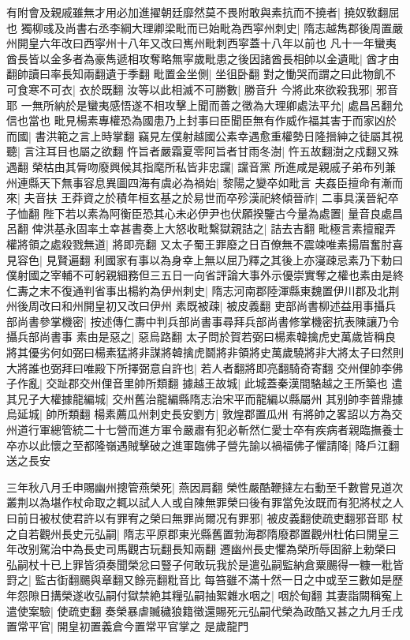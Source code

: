 有附會及親戚雖無才用必加進擢朝廷靡然莫不畏附敢與素抗而不撓者|{
	撓奴敎翻屈也}
獨柳彧及尚書右丞李綱大理卿梁毗而已始毗為西寜州刺史|{
	隋志越雋郡後周置嚴州開皇六年改曰西寜州十八年又改曰嶲州毗刺西寜蓋十八年以前也}
凡十一年蠻夷酋長皆以金多者為豪雋遞相攻奪略無寜歲毗患之後因諸酋長相帥以金遺毗|{
	酋才由翻帥讀曰率長知兩翻遺于季翻}
毗置金坐側|{
	坐徂卧翻}
對之慟哭而謂之曰此物飢不可食寒不可衣|{
	衣於既翻}
汝等以此相滅不可勝數|{
	勝音升}
今將此來欲殺我邪|{
	邪音耶}
一無所納於是蠻夷感悟遂不相攻擊上聞而善之徵為大理卿處法平允|{
	處昌呂翻允信也當也}
毗見楊素專權恐為國患乃上封事曰臣聞臣無有作威作福其害于而家凶於而國|{
	書洪範之言上時掌翻}
竊見左僕射越國公素幸遇愈重權勢日隆搢紳之徒屬其視聽|{
	言注耳目也屬之欲翻}
忤旨者嚴霜夏零阿旨者甘雨冬澍|{
	忤五故翻澍之戍翻又殊遇翻}
榮枯由其脣吻廢興候其指麾所私皆非忠讜|{
	讜音黨}
所進咸是親戚子弟布列兼州連縣天下無事容息異圖四海有虞必為禍始|{
	黎陽之變卒如毗言}
夫姦臣擅命有漸而來|{
	夫音扶}
王莽資之於積年桓玄基之於易世而卒殄漢祀終傾晉祚|{
	二事具漢晉紀卒子恤翻}
陛下若以素為阿衡臣恐其心未必伊尹也伏願揆鑒古今量為處置|{
	量音良處昌呂翻}
俾洪基永固率土幸甚書奏上大怒收毗繫獄親詰之|{
	詰去吉翻}
毗極言素擅寵弄權將領之處殺戮無道|{
	將即亮翻}
又太子蜀王罪廢之日百僚無不震竦唯素揚眉奮肘喜見容色|{
	見賢遍翻}
利國家有事以為身幸上無以屈乃釋之其後上亦寖疎忌素乃下勅曰僕射國之宰輔不可躬親細務但三五日一向省評論大事外示優崇實奪之權也素由是終仁夀之末不復通判省事出楊約為伊州刺史|{
	隋志河南郡陸渾縣東魏置伊川郡及北荆州後周改曰和州開皇初又改曰伊州}
素既被疎|{
	被皮義翻}
吏部尚書柳述益用事攝兵部尚書參掌機密|{
	按述傳仁夀中判兵部尚書事尋拜兵部尚書修掌機密抗表陳讓乃令攝兵部尚書事}
素由是惡之|{
	惡烏路翻}
太子問於賀若弼曰楊素韓擒虎史萬歲皆稱良將其優劣何如弼曰楊素猛將非謀將韓擒虎鬬將非領將史萬歲驍將非大將太子曰然則大將誰也弼拜曰唯殿下所擇弼意自許也|{
	若人者翻將即亮翻騎奇寄翻}
交州俚帥李佛子作亂|{
	交趾郡交州俚音里帥所類翻}
據越王故城|{
	此城蓋秦漢間駱越之王所築也}
遣其兄子大權據龍編城|{
	交州舊治龍編縣隋志治宋平而龍編以縣屬州}
其别帥李普鼎據烏延城|{
	帥所類翻}
楊素薦瓜州刺史長安劉方|{
	敦煌郡置瓜州}
有將帥之畧詔以方為交州道行軍總管統二十七營而進方軍令嚴肅有犯必斬然仁愛士卒有疾病者親臨撫養士卒亦以此懷之至都隆嶺遇賊擊破之進軍臨佛子營先諭以禍福佛子懼請降|{
	降戶江翻}
送之長安

三年秋八月壬申賜幽州摠管燕榮死|{
	燕因肩翻}
榮性嚴酷鞭撻左右動至千數嘗見道次叢荆以為堪作杖命取之輒以試人人或自陳無罪榮曰後有罪當免汝既而有犯將杖之人曰前日被杖使君許以有罪宥之榮曰無罪尚爾况有罪邪|{
	被皮義翻使疏吏翻邪音耶}
杖之自若觀州長史元弘嗣|{
	隋志平原郡東光縣舊置勃海郡隋廢郡置觀州杜佑曰開皇三年改别駕治中為長史司馬觀古玩翻長知兩翻}
遷幽州長史懼為榮所辱固辭上勅榮曰弘嗣杖十已上罪皆須奏聞榮忿曰豎子何敢玩我於是遣弘嗣監納倉粟颺得一糠一粃皆罸之|{
	監古衘翻颺與章翻又餘亮翻粃音比}
每笞雖不滿十然一日之中或至三數如是歷年怨隙日搆榮遂收弘嗣付獄禁絶其糧弘嗣抽絮雜水咽之|{
	咽於甸翻}
其妻詣闕稱寃上遣使案驗|{
	使疏吏翻}
奏榮暴虐贓穢狼籍徵還賜死元弘嗣代榮為政酷又甚之九月壬戌置常平官|{
	開皇初置義倉今置常平官掌之}
是歲龍門

